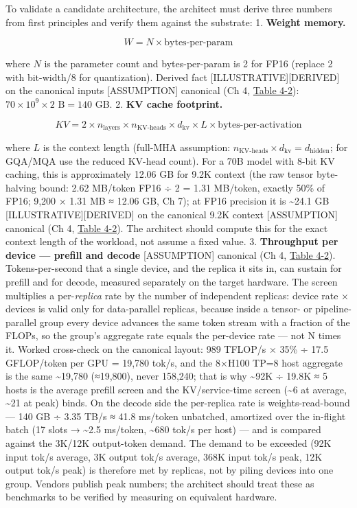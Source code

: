 To validate a candidate architecture, the architect must derive three
numbers from first principles and verify them against the substrate: 1.
\textbf{Weight memory.}

\[
W = N \times \text{bytes-per-param}
\]

where \(N\) is the parameter count and bytes-per-param is 2 for FP16
(replace 2 with bit-width/8 for quantization). Derived fact
\mbox{{[}ILLUSTRATIVE{]}}\hspace{0pt}\mbox{{[}DERIVED{]}} on the canonical inputs \mbox{{[}ASSUMPTION{]}}
canonical (Ch 4, \hyperref[tab:4.2]{Table 4-2}): \(70 \times 10^9 \times 2 \text{ B} = 140\)
GB. 2. \textbf{KV cache footprint.}

\[
KV = 2 \times n_\text{layers} \times n_{\text{KV-heads}} \times d_\text{kv} \times L \times \text{bytes-per-activation}
\]

where \(L\) is the context length (full-MHA assumption:
\(n_{\text{KV-heads}} \times d_\text{kv} = d_\text{hidden}\); for
GQA/MQA use the reduced KV-head count). For a 70B model with 8-bit KV
caching, this is approximately 12.06 GB for 9.2K context (the raw tensor
byte-halving bound: 2.62 MB/token FP16 ÷ 2 = 1.31 MB/token, exactly 50\%
of FP16; 9,200 × 1.31 MB ≈ 12.06 GB, Ch 7); at FP16 precision it is
\textasciitilde24.1 GB \mbox{{[}ILLUSTRATIVE{]}}\hspace{0pt}\mbox{{[}DERIVED{]}} on the canonical
9.2K context \mbox{{[}ASSUMPTION{]}} canonical (Ch 4, \hyperref[tab:4.2]{Table 4-2}). The architect
should compute this for the exact context length of the workload, not
assume a fixed value. 3. \textbf{Throughput per device --- prefill and
decode} \mbox{{[}ASSUMPTION{]}} canonical (Ch 4, \hyperref[tab:4.2]{Table 4-2}). Tokens-per-second
that a single device, and the replica it sits in, can sustain for
prefill and for decode, measured separately on the target hardware. The
screen multiplies a per-\emph{replica} rate by the number of independent
replicas: device rate × devices is valid only for data-parallel
replicas, because inside a tensor- or pipeline-parallel group every
device advances the same token stream with a fraction of the FLOPs, so
the group's aggregate rate equals the per-device rate --- not N times
it. Worked cross-check on the canonical layout: 989 TFLOP/s × 35\% ÷
17.5 GFLOP/token per GPU = 19,780 tok/s, and the 8×H100 TP=8 host
aggregate is the same \textasciitilde19,780 (≈19,800), never 158,240;
that is why \textasciitilde92K ÷ 19.8K ≈ 5 hosts is the average prefill
screen and the KV/service-time screen (\textasciitilde6 at average,
\textasciitilde21 at peak) binds. On the decode side the per-replica
rate is weights-read-bound --- 140 GB ÷ 3.35 TB/s ≈ 41.8 ms/token
unbatched, amortized over the in-flight batch (17 slots →
\textasciitilde2.5 ms/token, \textasciitilde680 tok/s per host) --- and
is compared against the 3K/12K output-token demand. The demand to be
exceeded (92K input tok/s average, 3K output tok/s average, 368K input
tok/s peak, 12K output tok/s peak) is therefore met by replicas, not by
piling devices into one group. Vendors publish peak numbers; the
architect should treat these as benchmarks to be verified by measuring
on equivalent hardware.

